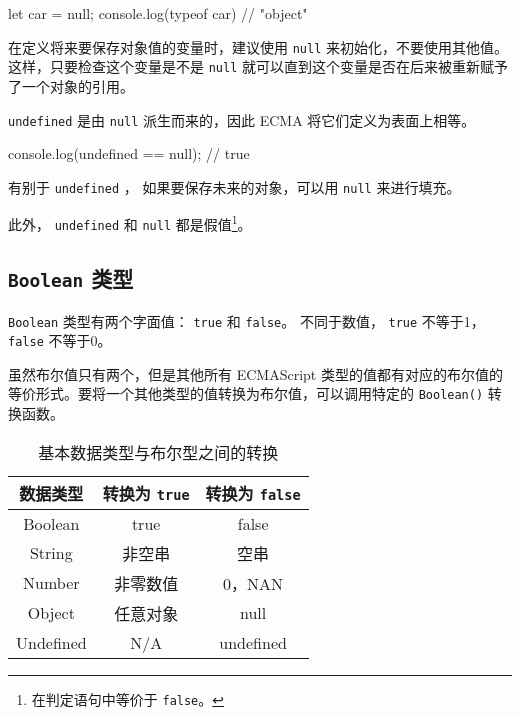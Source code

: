 \begin{JavaScript}
let car = null;
console.log(typeof car)     // "object"
\end{JavaScript}

在定义将来要保存对象值的变量时，建议使用 \texttt{null} 来初始化，不要使用其他值。这样，只要检查这个变量是不是 \texttt{null} 就可以直到这个变量是否在后来被重新赋予了一个对象的引用。

\texttt{undefined} 是由 \texttt{null} 派生而来的，因此 ECMA 将它们定义为表面上相等。

\begin{JavaScript}
console.log(undefined == null);     // true
\end{JavaScript}

有别于 \texttt{undefined} ， 如果要保存未来的对象，可以用 \texttt{null} 来进行填充。

此外， \texttt{undefined} 和 \texttt{null} 都是假值\footnote{在判定语句中等价于 \texttt{false}。 }。

\subsection{\texttt{Boolean} 类型}

\texttt{Boolean} 类型有两个字面值： \texttt{true} 和 \texttt{false}。 不同于数值， \texttt{true} 不等于1， \texttt{false} 不等于0。

虽然布尔值只有两个，但是其他所有 ECMAScript 类型的值都有对应的布尔值的等价形式。要将一个其他类型的值转换为布尔值，可以调用特定的 \texttt{Boolean()} 转换函数。

\begin{table}[H]
    \centering
    \small
    \caption{基本数据类型与布尔型之间的转换}
    \label{table:基本数据类型与布尔型之间的转换}
    \setlength{\tabcolsep}{18mm}
    \begin{tabular}{c|cc}
        \toprule
        \textbf{数据类型} & \textbf{转换为 \texttt{true}} & \textbf{转换为 \texttt{false}} \\
        \midrule
        Boolean & true & false\\
        String & 非空串 & 空串 \\
        Number & 非零数值 & 0，NAN \\
        Object & 任意对象 & null \\
        Undefined & N/A & undefined \\
        \bottomrule
    \end{tabular}
\end{table}

